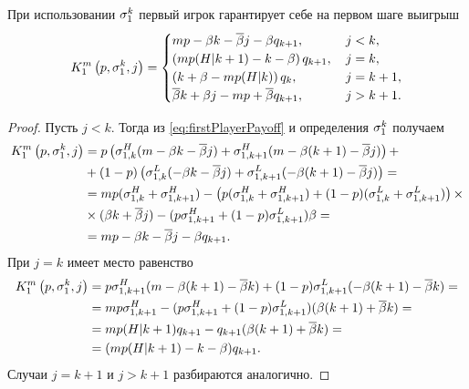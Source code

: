 \begin{proposition}
  При использовании $\fGeneral{k}$ первый игрок гарантирует себе на первом шаге
  выигрыш
  \begin{equation}
    \label{eq:lowerPayoffGeneral}
    \firstPlayerPayoff{1}{p}{\fGeneral{k}}{j} =
    \begin{cases}
      mp - \Co k - \DCo j - \Co q_{k+1},      & \, j < k,     \\
      \left(m p(H|k+1) - k - \Co \right) q_{k+1}, & \, j = k,     \\
      \left(k + \Co - m p(H|k) \right) q_k,       & \, j = k + 1, \\
      \DCo k + \Co j - mp + \DCo q_{k+1}, & \, j > k + 1.
    \end{cases}
  \end{equation}
\end{proposition}
\begin{proof}
  Пусть $j < k$. Тогда из \eqref{eq:firstPlayerPayoff} и определения
  $\fGeneral{k}$ получаем
  \begin{align*}
    \firstPlayerPayoff{1}{p}{\fGeneral{k}}{j} &=
    p \left( 
      \fGeneral[1,k]{H} (m - \Co k - \DCo j) +
      \fGeneral[1,k+1]{H} (m - \Co (k+1) - \DCo j)
    \right) + \\
    &+ (1-p) \left( 
      \fGeneral[1,k]{L} (- \Co k - \DCo j) +
      \fGeneral[1,k+1]{L} (- \Co (k+1) - \DCo j)
    \right) = \\
    &=
    m p (\fGeneral[1,k]{H} + \fGeneral[1,k+1]{H}) -
    \left(
      p (\fGeneral[1,k]{H} + \fGeneral[1,k+1]{H}) +
      (1-p) (\fGeneral[1,k]{L} + \fGeneral[1,k+1]{L})
    \right) \times \\ 
    &\times (\Co k + \DCo j) -
    (p \fGeneral[1,k+1]{H} + (1-p) \fGeneral[1,k+1]{L}) \Co = \\
    &= mp - \Co k - \DCo j - \Co q_{k+1}.
  \end{align*}
  При $j = k$ имеет место равенство
  \begin{align*}
    \firstPlayerPayoff{1}{p}{\fGeneral{k}}{j} 
    &=
      p \fGeneral[1,k+1]{H} (m - \Co (k+1) - \DCo k) +
      (1-p) \fGeneral[1,k+1]{L} (- \Co (k+1) - \DCo k) = \\
    &= m p \fGeneral[1,k+1]{H} - 
      (p \fGeneral[1,k+1]{H} + (1-p) \fGeneral[1,k+1]{L}) (\Co (k+1) + \DCo k) =\\
    &= m p(H|k+1) q_{k+1} - q_{k+1} (\Co (k+1) + \DCo k) = \\
    &= (m p(H|k+1) - k - \Co) q_{k+1}.
  \end{align*}
  Случаи $j = k + 1$ и $j > k + 1$ разбираются аналогично.
\end{proof}

